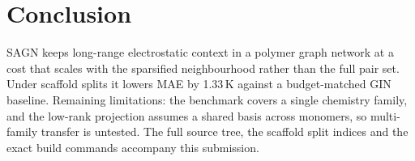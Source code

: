 \section{Conclusion}
\label{sec:concl}

SAGN keeps long-range electrostatic context in a polymer graph network at a
cost that scales with the sparsified neighbourhood rather than the full pair
set. Under scaffold splits it lowers MAE by 1.33\,K against a budget-matched GIN
baseline. Remaining limitations: the benchmark covers a single chemistry family,
and the low-rank projection assumes a shared basis across monomers, so
multi-family transfer is untested. The full source tree, the scaffold split
indices and the exact build commands accompany this submission.
